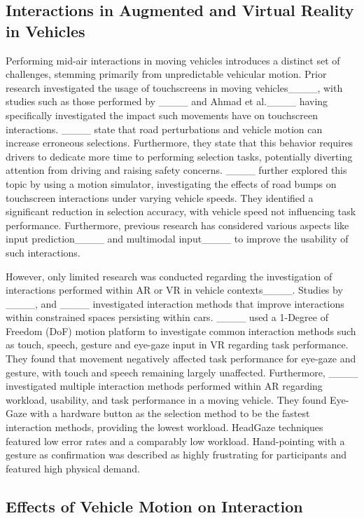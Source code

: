 \subsection{Interactions in Augmented and Virtual Reality in Vehicles}


Performing mid-air interactions in moving vehicles introduces a distinct set of challenges, stemming primarily from unpredictable vehicular motion. Prior research investigated the usage of touchscreens in moving vehicles____, with studies such as those performed by ____ and Ahmad et al.____ having specifically investigated the impact such movements have on touchscreen interactions. ____ state that road perturbations and vehicle motion can increase erroneous selections. Furthermore, they state that this behavior requires drivers to dedicate more time to performing selection tasks, potentially diverting attention from driving and raising safety concerns. ____ further explored this topic by using a motion simulator, investigating the effects of road bumps on touchscreen interactions under varying vehicle speeds. They identified a significant reduction in selection accuracy, with vehicle speed not influencing task performance. Furthermore, previous research has considered various aspects like input prediction____ and multimodal input____ to improve the usability of such interactions.

However, only limited research was conducted regarding the investigation of interactions performed within AR or VR in vehicle contexts____. Studies by ____, and ____ investigated interaction methods that improve interactions within constrained spaces persisting within cars. 
____ used a 1-Degree of Freedom (DoF) motion platform to investigate common interaction methods such as touch, speech, gesture and eye-gaze input in VR regarding task performance. They found that movement negatively affected task performance for eye-gaze and gesture, with touch and speech remaining largely unaffected. Furthermore, ____ investigated multiple interaction methods performed within AR regarding workload, usability, and task performance in a moving vehicle. They found Eye-Gaze with a hardware button as the selection method to be the fastest interaction methods, providing the lowest workload. HeadGaze techniques featured low error rates and a comparably low workload. Hand-pointing with a gesture as confirmation was described as highly frustrating for participants and featured high physical demand.




\subsection{Effects of Vehicle Motion on Interaction}

